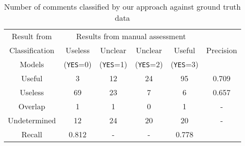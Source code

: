 \begin{table}[!t]
\centering

\caption{Number of comments classified by our approach against ground truth data}
\begin{tabular}{cccccc}
\hline
Result from & \multicolumn{4}{c}{Results from manual assessment}  & \multirow{3}{*}{Precision}\\ \cline{2-5}
Classification &  Useless  & Unclear  & Unclear & Useful \\
Models&  (\texttt{YES}=0) & (\texttt{YES}=1) & (\texttt{YES}=2) & (\texttt{YES}=3) \\
\hline \hline
Useful & 3 & 12 & 24 & 95 & 0.709\\
Useless & 69 & 23 & 7 & 6 &  0.657\\
Overlap & 1 & 1 & 0 & 1 & - \\
Undetermined & 12 & 24 & 20 & 20 & - \\
\hline
Recall & 0.812 & - & - & 0.778\\ \hline 
\end{tabular}
\label{tb:classify_number}
\end{table}


